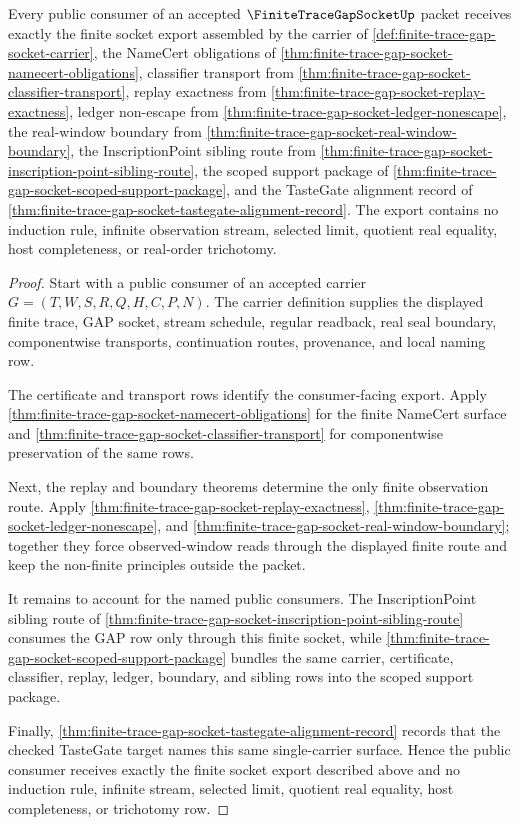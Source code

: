 \begin{theorem}
\label{thm:finite-trace-gap-socket-public-consumer-export}
Every public consumer of an accepted $\FiniteTraceGapSocketUp$ packet receives exactly the finite socket export assembled by the carrier of \autoref{def:finite-trace-gap-socket-carrier}, the NameCert obligations of \autoref{thm:finite-trace-gap-socket-namecert-obligations}, classifier transport from \autoref{thm:finite-trace-gap-socket-classifier-transport}, replay exactness from \autoref{thm:finite-trace-gap-socket-replay-exactness}, ledger non-escape from \autoref{thm:finite-trace-gap-socket-ledger-nonescape}, the real-window boundary from \autoref{thm:finite-trace-gap-socket-real-window-boundary}, the InscriptionPoint sibling route from \autoref{thm:finite-trace-gap-socket-inscription-point-sibling-route}, the scoped support package of \autoref{thm:finite-trace-gap-socket-scoped-support-package}, and the TasteGate alignment record of \autoref{thm:finite-trace-gap-socket-tastegate-alignment-record}. The export contains no induction rule, infinite observation stream, selected limit, quotient real equality, host completeness, or real-order trichotomy.
\end{theorem}
\begin{proof}
Start with a public consumer of an accepted carrier $G=(T,W,S,R,Q,H,C,P,N)$. The carrier definition supplies the displayed finite trace, GAP socket, stream schedule, regular readback, real seal boundary, componentwise transports, continuation routes, provenance, and local naming row.

The certificate and transport rows identify the consumer-facing export. Apply \autoref{thm:finite-trace-gap-socket-namecert-obligations} for the finite NameCert surface and \autoref{thm:finite-trace-gap-socket-classifier-transport} for componentwise preservation of the same rows.

Next, the replay and boundary theorems determine the only finite observation route. Apply \autoref{thm:finite-trace-gap-socket-replay-exactness}, \autoref{thm:finite-trace-gap-socket-ledger-nonescape}, and \autoref{thm:finite-trace-gap-socket-real-window-boundary}; together they force observed-window reads through the displayed finite route and keep the non-finite principles outside the packet.

It remains to account for the named public consumers. The InscriptionPoint sibling route of \autoref{thm:finite-trace-gap-socket-inscription-point-sibling-route} consumes the GAP row only through this finite socket, while \autoref{thm:finite-trace-gap-socket-scoped-support-package} bundles the same carrier, certificate, classifier, replay, ledger, boundary, and sibling rows into the scoped support package.

Finally, \autoref{thm:finite-trace-gap-socket-tastegate-alignment-record} records that the checked TasteGate target names this same single-carrier surface. Hence the public consumer receives exactly the finite socket export described above and no induction rule, infinite stream, selected limit, quotient real equality, host completeness, or trichotomy row.
\end{proof}

